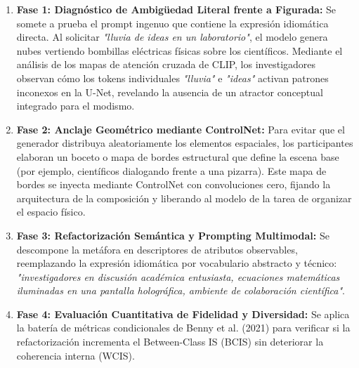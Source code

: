 \begin{enumerate}
    \item \textbf{Fase 1: Diagnóstico de Ambigüedad Literal frente a Figurada:} Se somete a prueba el prompt ingenuo que contiene la expresión idiomática directa. Al solicitar \textit{"lluvia de ideas en un laboratorio"}, el modelo genera nubes vertiendo bombillas eléctricas físicas sobre los científicos. Mediante el análisis de los mapas de atención cruzada de CLIP, los investigadores observan cómo los tokens individuales \textit{"lluvia"} e \textit{"ideas"} activan patrones inconexos en la U-Net, revelando la ausencia de un atractor conceptual integrado para el modismo.
    \item \textbf{Fase 2: Anclaje Geométrico mediante ControlNet:} Para evitar que el generador distribuya aleatoriamente los elementos espaciales, los participantes elaboran un boceto o mapa de bordes estructural que define la escena base (por ejemplo, científicos dialogando frente a una pizarra). Este mapa de bordes se inyecta mediante ControlNet con convoluciones cero, fijando la arquitectura de la composición y liberando al modelo de la tarea de organizar el espacio físico.
    \item \textbf{Fase 3: Refactorización Semántica y Prompting Multimodal:} Se descompone la metáfora en descriptores de atributos observables, reemplazando la expresión idiomática por vocabulario abstracto y técnico: \textit{"investigadores en discusión académica entusiasta, ecuaciones matemáticas iluminadas en una pantalla holográfica, ambiente de colaboración científica"}.
    \item \textbf{Fase 4: Evaluación Cuantitativa de Fidelidad y Diversidad:} Se aplica la batería de métricas condicionales de Benny et al. (2021) para verificar si la refactorización incrementa el Between-Class IS (BCIS) sin deteriorar la coherencia interna (WCIS).
\end{enumerate}

